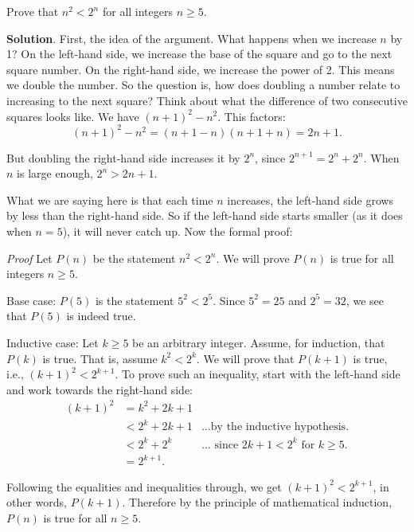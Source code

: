 \documentclass[11pt,]{book}
\makeatletter
\theoremstyle{ptxplainnotitle}
\theoremstyle{ptxplaintitle}
\renewcommand*{\proofname}{Proof}
\renewenvironment{proof}[1][\proofname]{\par
  \pushQED{\qed}%
  \normalfont \topsep6\p@\@plus6\p@\relax
  \trivlist
  \item\relax
    {\itshape
    #1\@addpunct{.}}\hspace\labelsep\ignorespaces
}{%
  \popQED\endtrivlist\@endpefalse
}
\theoremstyle{ptxdefinitionnotitle}
\theoremstyle{ptxdefinitiontitle}
\theoremstyle{ptxdefinitionnotitle}
\theoremstyle{ptxdefinitiontitle}
\theoremstyle{ptxdefinitionnotitle}
\theoremstyle{ptxdefinitiontitle}
\theoremstyle{ptxdefinitiontitlenonumber}
\theoremstyle{ptxdefinitiontitlenonumber}
\numberwithin{equation}{chapter}
\newcommand{\lt}{<}
\newcommand{\amp}{&}
\makeatother
\begin{document}
\begin{example}\label{example-27}
\hypertarget{p-587}{}%
Prove that \(n^2 \lt  2^n\) for all integers \(n \ge 5\).%
\par\smallskip%
\noindent\textbf{Solution}.\hypertarget{solution-79}{}\quad%
\hypertarget{p-588}{}%
First, the idea of the argument. What happens when we increase \(n\) by 1? On the left-hand side, we increase the base of the square and go to the next square number. On the right-hand side, we increase the power of 2. This means we double the number. So the question is, how does doubling a number relate to increasing to the next square? Think about what the difference of two consecutive squares looks like. We have \((n+1)^2 - n^2\). This factors:%
\begin{equation*}
(n+1)^2 - n^2 = (n+1-n)(n+1+n) = 2n+1.
\end{equation*}
%
\par
\hypertarget{p-589}{}%
But doubling the right-hand side increases it by \(2^n\), since \(2^{n+1} = 2^n + 2^n\). When \(n\) is large enough, \(2^n > 2n + 1\).%
\par
\hypertarget{p-590}{}%
What we are saying here is that each time \(n\) increases, the left-hand side grows by less than the right-hand side. So if the left-hand side starts smaller (as it does when \(n = 5\)), it will never catch up. Now the formal proof:%
\begin{proof}\hypertarget{proof-4}{}
\hypertarget{p-591}{}%
Let \(P(n)\) be the statement \(n^2 \lt  2^n\). We will prove \(P(n)\) is true for all integers \(n \ge 5\).%
\par
\hypertarget{p-592}{}%
Base case: \(P(5)\) is the statement \(5^2 \lt  2^5\). Since \(5^2 = 25\) and \(2^5 = 32\), we see that \(P(5)\) is indeed true.%
\par
\hypertarget{p-593}{}%
Inductive case: Let \(k \ge 5\) be an arbitrary integer. Assume, for induction, that \(P(k)\) is true. That is, assume \(k^2 \lt  2^k\). We will prove that \(P(k+1)\) is true, i.e., \((k+1)^2 \lt  2^{k+1}\). To prove such an inequality, start with the left-hand side and work towards the right-hand side:%
\begin{align*}
(k+1)^2 \amp = k^2 + 2k + 1 \amp\\
\amp \lt 2^k + 2k + 1 \amp \ldots\text{by the inductive hypothesis.}\\
\amp \lt 2^k + 2^k \amp \ldots\text{ since } 2k + 1 \lt  2^k \text{ for }k \ge 5.\\
\amp = 2^{k+1}. \amp
\end{align*}
%
\par
\hypertarget{p-594}{}%
Following the equalities and inequalities through, we get \((k+1)^2 \lt  2^{k+1}\), in other words, \(P(k+1)\). Therefore by the principle of mathematical induction, \(P(n)\) is true for all \(n \ge 5\).%
\end{proof}
\end{example}
\end{document}
